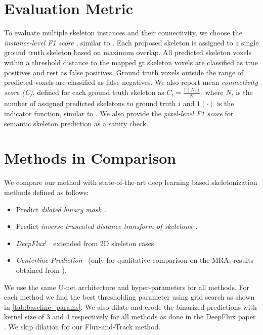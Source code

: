 \section{Evaluation Metric}
To evaluate multiple skeleton instances and their connectivity, we choose the {\em instance-level F1 score} , similar to \cite{Liang2019}. Each proposed skeleton is assigned to a single ground truth skeleton based on maximum overlap. All predicted skeleton voxels within a threshold distance to the mapped gt skeleton voxels are classified as true positives and rest as false positives. Ground truth voxels outside the range of predicted voxels are classified as false negatives. We also report mean {\em connectivity score (C)}, defined for each ground truth skeleton as $C_{i} = \frac{1(N_{i})}{N_{i}}$, where $N_{i}$ is the number of assigned predicted skeletons to ground truth $i$ and $1(\cdot)$ is the indicator function, similar to \cite{Liang2019}.
We also provide the {\em pixel-level F1 score} for semantic skeleton prediction as a sanity check.

\section{Methods in Comparison}
We compare our method with state-of-the-art deep learning based skeletonization methods defined as follows:
 
\begin{itemize}
	\item Predict {\em dilated binary mask}~\cite{cciccek20163d,Tetteh2018}.
	\item Predict {\em inverse truncated distance transform of skeletons}~\cite{wang2019deep}.
	\item {\em DeepFlux$^{\dagger}$}~\cite{Wang2019} extended from 2D skeleton cases.
	\item {\em Centerline Prediction}~\cite{sironi2015} (only for qualitative comparison on the MRA, results obtained from \cite{Koziski2018}).
\end{itemize}

We use the same U-net architecture and hyper-parameters for all methods. For each method we find the best thresholding parameter using grid search as shown in \autoref{tab:baseline_params}. We also dilate and erode the binarized predictions with kernel size of 3 and 4 respectively for all methods as done in the DeepFlux paper \cite{Wang2019}. We skip dilation for our Flux-and-Track method.

